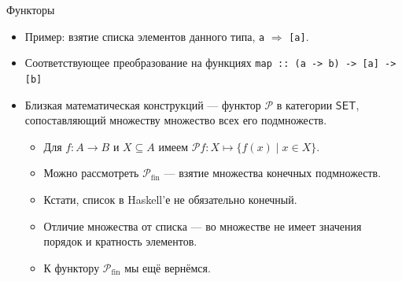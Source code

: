 \documentclass[xcolor=dvipsnames]{beamer}
\newcommand{\Pc}{\mathcal{P}}
\begin{document}
\begin{frame}{Функторы}
 
 \begin{itemize}[<+->]
  \item Пример: взятие списка элементов данного типа, \texttt{a} $\Rightarrow$ \texttt{[a]}.
  \item Соответствующее преобразование на функциях \texttt{map :: (a -> b) -> [a] -> [b]}
  \item Близкая математическая конструкций --- функтор $\Pc$ в категории $\mathsf{SET}$, сопоставляющий множеству множество всех его подмножеств.
  \begin{itemize}
 \item Для $f \colon A \to B$ и $X \subseteq A$ имеем $\Pc f \colon X \mapsto \{ f(x) \mid x \in X \}$.
 \item Можно рассмотреть $\Pc_{\mathrm{fin}}$ --- взятие множества конечных подмножеств.
 \item Кстати, список в Haskell'е не обязательно конечный.
 \item Отличие множества от списка --- во множестве не имеет значения порядок и кратность элементов.
 \item К функтору $\Pc_{\mathrm{fin}}$ мы ещё вернёмся.
 \end{itemize}
 \end{itemize}

\end{frame}
\end{document}
